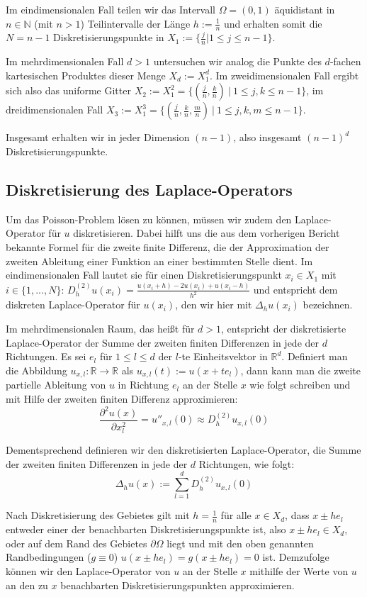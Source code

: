 \documentclass{scrartcl}
\newcommand{\R}{\mathbb{R}}
\begin{document}
Im eindimensionalen Fall teilen wir das Intervall $\Omega=(0,1)$ äquidistant in
$n\in\mathbb{N}$ (mit $n>1$) Teilintervalle der Länge $h:=\frac{1}{n}$ und erhalten somit die $N=n-1$ Diskretisierungspunkte in
$X_1:=\{\frac{j}{n} | 1\leq j \leq n-1\}$.

Im mehrdimensionalen Fall $d>1$ untersuchen wir analog die Punkte des $d$-fachen kartesischen Produktes dieser Menge $X_d := X_1^d$.
Im zweidimensionalen Fall ergibt sich also das uniforme Gitter $X_2 := X_1^2 = \{(\frac{j}{n}, \frac{k}{n}) \: | \: 1\leq j,k \leq n-1\}$,
im dreidimensionalen Fall $X_3 := X_1^3 = \{(\frac{j}{n}, \frac{k}{n}, \frac{m}{n}) \: | \: 1\leq j,k,m \leq n-1\}$.

Insgesamt erhalten wir in jeder Dimension $(n-1)$, also insgesamt $(n-1)^d$ Diskretisierungspunkte.

\subsection{Diskretisierung des Laplace-Operators}
Um das Poisson-Problem lösen zu können, müssen wir zudem den Laplace-Operator für $u$ diskretisieren.
Dabei hilft uns die aus dem vorherigen Bericht bekannte Formel für die zweite finite Differenz, die der Approximation der zweiten Ableitung einer Funktion an einer bestimmten Stelle dient.
Im eindimensionalen Fall lautet sie für einen Diskretisierungspunkt $x_i\in X_1$ mit $i \in \{1,...,N\}$:
$D_h^{(2)}u(x_i) = \frac{u(x_i+h) - 2u(x_i)+u(x_i-h)}{h^2}$ und entspricht dem diskreten Laplace-Operator für $u(x_i)$, den wir hier mit $\Delta_h u(x_i)$ bezeichnen.

Im mehrdimensionalen Raum, das heißt für $d>1$, entspricht der diskretisierte Laplace-Operator der Summe der zweiten finiten Differenzen in jede der $d$ Richtungen.
Es sei $e_l$ für $1\leq l \leq d$ der $l$-te Einheitsvektor in $\R^d$. Definiert man die Abbildung $u_{x,l}:\R\to\R$ als $u_{x,l}(t):=u(x+te_l)$, dann kann man die zweite partielle Ableitung von $u$ in Richtung $e_l$ an der Stelle $x$ wie folgt schreiben und mit Hilfe der zweiten finiten Differenz approximieren:
\[\frac{\partial^2 u(x)}{\partial x_l^2} = u''_{x,l}(0) \approx D_h^{(2)}u_{x,l}(0)\]

Dementsprechend definieren wir den diskretisierten Laplace-Operator, die Summe der zweiten finiten Differenzen in jede der $d$ Richtungen, wie folgt:
\[\Delta_h u(x):= \sum_{l=1}^{d} D_h^{(2)}u_{x,l}(0)\]

Nach Diskretisierung des Gebietes gilt mit $h=\frac{1}{n}$ für alle $x\in X_d$, dass $x\pm he_l$ entweder einer der benachbarten Diskretisierungspunkte ist, also $x\pm he_l\in X_d$, oder auf dem Rand des Gebietes $\partial\Omega$ liegt und mit den oben genannten Randbedingungen ($g\equiv0$) $u(x\pm he_l)=g(x\pm he_l)=0$ ist.
Demzufolge können wir den Laplace-Operator von $u$ an der Stelle $x$ mithilfe der Werte von $u$ an den zu $x$ benachbarten Diskretisierungspunkten approximieren.
\end{document}
